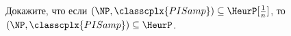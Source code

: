 Докажите, что если $(\NP, \classcplx{PISamp}) \subseteq \HeurP[\frac{1}{n}]$, то $(\NP,
\classcplx{PISamp}) \subseteq \HeurP$.
